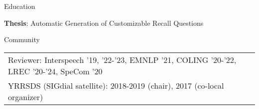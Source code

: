 \documentclass{resume} %
\begin{document}
\begin{rSection}{Education}
\begin{rSubsection}
		\setlength{\itemindent}{.5cm}
		
		\item \textbf{Thesis}: Automatic Generation of Customizable Recall Questions
	\end{rSubsection}
	
\end{rSection}

\begin{rSection}{Community}
	\begin{tabular}{l}
		Reviewer: Interspeech '19, '22-'23, EMNLP '21, COLING '20-'22, LREC '20-'24, SpeCom '20\\
		YRRSDS (SIGdial satellite): 2018-2019 (chair), 2017 (co-local organizer)
	\end{tabular}
\end{rSection}

\pagebreak
\end{document}

